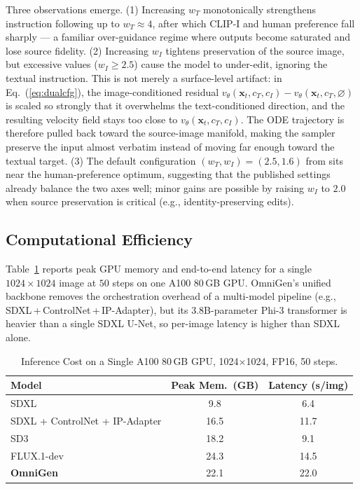 \documentclass[conference]{IEEEtran}
\begin{document}
Three observations emerge. (1) Increasing $w_T$ monotonically strengthens instruction following up to $w_T{\approx}4$, after which CLIP-I and human preference fall sharply --- a familiar over-guidance regime where outputs become saturated and lose source fidelity. (2) Increasing $w_I$ tightens preservation of the source image, but excessive values ($w_I{\geq}2.5$) cause the model to under-edit, ignoring the textual instruction. This is not merely a surface-level artifact: in Eq.~(\ref{eq:dualcfg}), the image-conditioned residual $v_\theta(\mathbf{x}_t,c_T,c_I)-v_\theta(\mathbf{x}_t,c_T,\varnothing)$ is scaled so strongly that it overwhelms the text-conditioned direction, and the resulting velocity field stays too close to $v_\theta(\mathbf{x}_t,c_T,c_I)$. The ODE trajectory is therefore pulled back toward the source-image manifold, making the sampler preserve the input almost verbatim instead of moving far enough toward the textual target. (3) The default configuration $(w_T,w_I)=(2.5,1.6)$ from \cite{omnigen2024} sits near the human-preference optimum, suggesting that the published settings already balance the two axes well; minor gains are possible by raising $w_I$ to $2.0$ when source preservation is critical (e.g., identity-preserving edits).

\subsection{Computational Efficiency}
Table~\ref{tab:efficiency} reports peak GPU memory and end-to-end latency for a single $1024\times 1024$ image at $50$ steps on one A100 80\,GB GPU. OmniGen's unified backbone removes the orchestration overhead of a multi-model pipeline (e.g., SDXL\,+\,ControlNet\,+\,IP-Adapter), but its 3.8B-parameter Phi-3 transformer is heavier than a single SDXL U-Net, so per-image latency is higher than SDXL alone.

\begin{table}[htbp]
\caption{Inference Cost on a Single A100 80\,GB GPU, 1024$\times$1024, FP16, 50 steps.}
\label{tab:efficiency}
\centering
\renewcommand{\arraystretch}{1.15}
\begin{tabular}{l c c}
\toprule
\textbf{Model} & \textbf{Peak Mem.\ (GB)} & \textbf{Latency (s/img)} \\
\midrule
SDXL                           & 9.8  & 6.4 \\
SDXL + ControlNet + IP-Adapter & 16.5 & 11.7 \\
SD3                            & 18.2 & 9.1 \\
FLUX.1-dev                     & 24.3 & 14.5 \\
\textbf{OmniGen}               & 22.1 & 22.0 \\
\bottomrule
\end{tabular}
\end{table}
\end{document}
